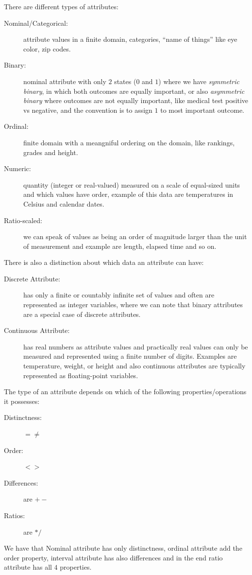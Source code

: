There are different types of attributes:
\begin{description}
    \item [Nominal/Categorical: ] attribute values in a finite domain, categories, “name of things” like
                                  eye color, zip codes.
    \item [Binary: ] nominal attribute with only $2$ states ($0$ and $1$) where we have \emph{symmetric binary},
                     in which both outcomes are equally important, or also \emph{asymmetric binary} where 
                     outcomes are not equally important, like medical test positive vs negative, and the convention
                     is to assign $1$ to most important outcome.
    \item [Ordinal: ] finite domain with a meangniful ordering on the domain, like rankings, grades and height.
    \item [Numeric: ] quantity (integer or real-valued) measured on a scale of equal-sized units and which
                      values have order, example of this data are temperatures in Celsius and calendar dates.
    \item [Ratio-scaled: ] we can speak of values as being an order of magnitude larger than the unit of measurement
                           and example are length, elapsed time and so on.
\end{description}
There is also a distinction about which data an attribute can have:
\begin{description}
    \item [Discrete Attribute: ] has only a finite or countably infinite set of values and often are represented
                                 as integer variables, where we can note that binary attributes are a special
                                 case of discrete attributes.
    \item [Continuous Attribute: ] has real numbers as attribute values and practically real values can only
                                   be measured and represented using a finite number of digits.\newline
                                   Examples are temperature, weight, or height and also continuous attributes
                                   are typically represented as floating-point variables.
\end{description}
The type of an attribute depends on which of the following properties/operations it possesses:
\begin{description}
    \item [Distinctness: ] $= \neq$
    \item [Order: ] $< >$
    \item [Differences: ] are $+ -$
    \item [Ratios: ] are $* /$
\end{description}
We have that Nominal attribute has only distinctness, ordinal attribute add the order property, interval
attribute has also differences and in the end ratio attribute has all $4$ properties.

